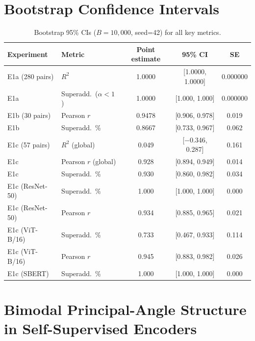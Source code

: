 \documentclass{article}
\begin{document}
\section{Bootstrap Confidence Intervals}
\label{app:bootstrap}

\begin{table}[h]
\centering
\caption{Bootstrap 95\% CIs ($B=10{,}000$, seed=42) for all key metrics.}
\label{tab:bootstrap_ci}
\begin{tabular}{llccc}
\toprule
Experiment & Metric & Point estimate & 95\% CI & SE \\
\midrule
E1a (280 pairs)  & $R^2$                  & 1.0000 & [1.0000, 1.0000] & 0.000000 \\
E1a                & Superadd.\ ($\alpha<1$) & 1.0000 & [1.000, 1.000]  & 0.000000 \\
E1b (30 pairs)     & Pearson $r$             & 0.9478 & [0.906, 0.978]  & 0.019 \\
E1b                & Superadd.\ \%          & 0.8667 & [0.733, 0.967]  & 0.062 \\
E1c (57 pairs)     & $R^2$ (global)         & 0.049  & [$-$0.346, 0.287] & 0.161 \\
E1c                & Pearson $r$ (global)    & 0.928  & [0.894, 0.949]  & 0.014 \\
E1c                & Superadd.\ \%          & 0.930  & [0.860, 0.982]  & 0.034 \\
E1c (ResNet-50)    & Superadd.\ \%          & 1.000  & [1.000, 1.000]  & 0.000 \\
E1c (ResNet-50)    & Pearson $r$             & 0.934  & [0.885, 0.965]  & 0.021 \\
E1c (ViT-B/16)     & Superadd.\ \%          & 0.733  & [0.467, 0.933]  & 0.114 \\
E1c (ViT-B/16)     & Pearson $r$             & 0.945  & [0.883, 0.982]  & 0.026 \\
E1c (SBERT)        & Superadd.\ \%          & 1.000  & [1.000, 1.000]  & 0.000 \\
\bottomrule
\end{tabular}
\end{table}

\section{Bimodal Principal-Angle Structure in Self-Supervised Encoders}
\label{app:bimodal}
\end{document}

